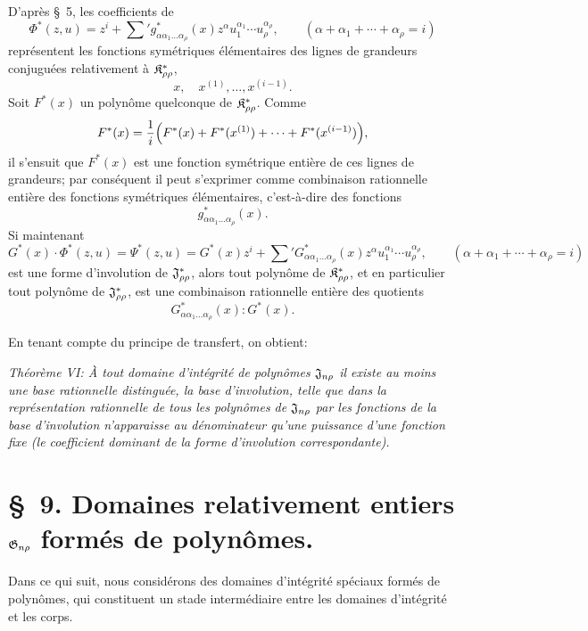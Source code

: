 D'après \S\ 5, les coefficients de
\[
  \Phi^*(z,u)=z^i+\sum{}' g^*_{\alpha\alpha_1\ldots\alpha_\rho}(x)
  z^\alpha u_1^{\alpha_1}\cdots u_\rho^{\alpha_\rho},
  \qquad
  (\alpha+\alpha_1+\cdots+\alpha_\rho=i)
\]
représentent les fonctions symétriques élémentaires des lignes de grandeurs conjuguées relativement à $\mathfrak{K}^*_{\rho\rho}$,
\[
  x,\quad x^{(1)},\ldots,x^{(i-1)}.
\]
Soit $F^*(x)$ un polynôme quelconque de $\mathfrak{K}^*_{\rho\rho}$. Comme
\[
  F^*(x)=\frac1i\Bigl(F^*(x)+F^*(x^{(1)})+
  \cdots+F^*(x^{(i-1)})\Bigr),
\]
il s'ensuit que $F^*(x)$ est une fonction symétrique entière de ces lignes de grandeurs; par conséquent il peut s'exprimer comme combinaison rationnelle entière des fonctions symétriques élémentaires, c'est-à-dire des fonctions
\[
  g^*_{\alpha\alpha_1\ldots\alpha_\rho}(x).
\]
Si maintenant
\[
  G^*(x)\cdot\Phi^*(z,u)=\Psi^*(z,u)
  =G^*(x)z^i+
  \sum{}'G^*_{\alpha\alpha_1\ldots\alpha_\rho}(x)
  z^\alpha u_1^{\alpha_1}\cdots u_\rho^{\alpha_\rho},
  \qquad
  (\alpha+\alpha_1+\cdots+\alpha_\rho=i)
\]
est une forme d'involution de $\mathfrak{J}^*_{\rho\rho}$, alors tout polynôme de $\mathfrak{K}^*_{\rho\rho}$, et en particulier tout polynôme de $\mathfrak{J}^*_{\rho\rho}$, est une combinaison rationnelle entière des quotients
\[
  G^*_{\alpha\alpha_1\ldots\alpha_\rho}(x):G^*(x).
\]

En tenant compte du principe de transfert, on obtient:

\emph{Théorème VI: À tout domaine d’intégrité de polynômes $\mathfrak{J}_{n\rho}$ il existe au moins une base rationnelle distinguée, la base d'involution, telle que dans la représentation rationnelle de tous les polynômes de $\mathfrak{J}_{n\rho}$ par les fonctions de la base d'involution n'apparaisse au dénominateur qu'une puissance d'une fonction fixe (le coefficient dominant de la forme d'involution correspondante).}

\section*{\S\ 9. Domaines relativement entiers $\mathfrak{G}_{n\rho}$ formés de polynômes.}

Dans ce qui suit, nous considérons des domaines d’intégrité spéciaux formés de polynômes, qui constituent un stade intermédiaire entre les domaines d’intégrité et les corps.

